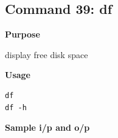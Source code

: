 \subsection{Command 39: df} 
\textbf{Purpose}
\begin{flushleft}
 display free disk space
\end{flushleft}
\textbf{Usage}
\begin{verbatim}
df
df -h
\end{verbatim}
\textbf{Sample i/p and o/p}
\begin{figure}[H] 
\end{figure}
